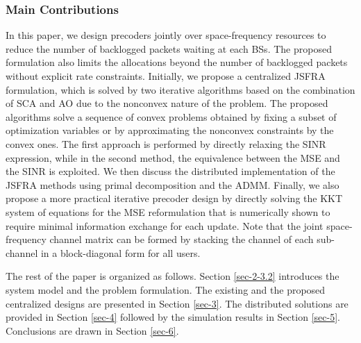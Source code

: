 \subsubsection*{Main Contributions}
In this paper, we design precoders jointly over space-frequency resources to reduce the number of backlogged packets waiting at each \acp{BS}. The proposed formulation also limits the allocations beyond the number of backlogged packets without explicit rate constraints. Initially, we propose a centralized \ac{JSFRA} formulation, which is solved by two iterative algorithms based on the combination of \ac{SCA} and \ac{AO} due to the nonconvex nature of the problem. The proposed algorithms solve a sequence of convex problems obtained by fixing a subset of optimization variables or by approximating the nonconvex constraints by the convex ones. The first approach is performed by directly relaxing the \ac{SINR} expression, while in the second method, the equivalence between the \ac{MSE} and the \ac{SINR} is exploited. We then discuss the distributed implementation of the \ac{JSFRA} methods using primal decomposition and the \ac{ADMM}. Finally, we also propose a more practical iterative precoder design by directly solving the \ac{KKT} system of equations for the \ac{MSE} reformulation that is numerically shown to require minimal information exchange for each update. Note that the joint space-frequency channel matrix can be formed by stacking the channel of each sub-channel in a block-diagonal form for all users.

The rest of the paper is organized as follows. Section \ref{sec-2-3.2} introduces the system model and the problem formulation. The existing and the proposed centralized designs are presented in Section \ref{sec-3}. The distributed solutions are provided in Section \ref{sec-4} followed by the simulation results in Section \ref{sec-5}. Conclusions are drawn in Section \ref{sec-6}.